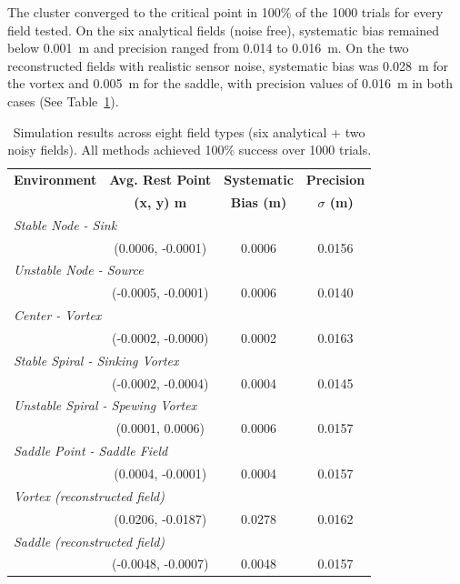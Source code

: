 \documentclass[lettersize,journal]{IEEEtran}
\begin{document}
 The cluster converged to the critical point in 100\% of the 1000 trials for every field tested. On the six analytical fields (noise free), systematic bias remained below 0.001~m and precision ranged from 0.014 to 0.016~m. On the two reconstructed fields with realistic sensor noise, systematic bias was 0.028~m for the vortex and 0.005~m for the saddle, with precision values of 0.016~m in both cases (See Table~\ref{tab:simulation_estimation_results}).


\begin{table}[!t]
\footnotesize
\centering
\caption{Simulation results across eight field types (six analytical + two noisy fields). All methods achieved 100\% success over 1000 trials.}
\label{tab:simulation_estimation_results}
\setlength{\tabcolsep}{4pt}
\begin{tabular}{lccc}
\hline
\textbf{Environment} & \textbf{Avg. Rest Point} & \textbf{Systematic} & \textbf{Precision} \\
 & \textbf{(x, y) m} & \textbf{Bias (m)} & \textbf{$\sigma$ (m)} \\
\hline
\multicolumn{4}{l}{\textit{Stable Node - Sink}} \\
\hline
 & (0.0006, -0.0001) & 0.0006 & 0.0156 \\
\hline
\multicolumn{4}{l}{\textit{Unstable Node - Source}} \\
\hline
 & (-0.0005, -0.0001) & 0.0006 & 0.0140 \\
\hline
\multicolumn{4}{l}{\textit{Center - Vortex}} \\
\hline
 & (-0.0002, -0.0000) & 0.0002 & 0.0163 \\
\hline
\multicolumn{4}{l}{\textit{Stable Spiral - Sinking Vortex}} \\
\hline
 & (-0.0002, -0.0004) & 0.0004 & 0.0145 \\
\hline
\multicolumn{4}{l}{\textit{Unstable Spiral - Spewing Vortex}} \\
\hline
 & (0.0001, 0.0006) & 0.0006 & 0.0157 \\
\hline
\multicolumn{4}{l}{\textit{Saddle Point - Saddle Field}} \\
\hline
 & (0.0004, -0.0001) & 0.0004 & 0.0157 \\
\hline
\multicolumn{4}{l}{\textit{Vortex (reconstructed field)}} \\
\hline
 & (0.0206, -0.0187) & 0.0278 & 0.0162 \\
\hline
\multicolumn{4}{l}{\textit{Saddle (reconstructed field)}} \\
\hline
 & (-0.0048, -0.0007) & 0.0048 & 0.0157 \\
\hline
\end{tabular}
\end{table}
\end{document}
